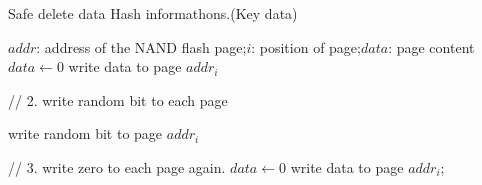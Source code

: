 \documentclass{ctexart}
\begin{document}
\begin{algorithm}[htb]
  \caption{Safe delete data Hash informathons.(Key data)}
  \begin{algorithmic}[1]
    \REQUIRE
    $addr$: address of the NAND flash page;$i$: position of page;$data$: page content
    \STATE $data \gets 0$
    \STATE write data to page $addr_i$
    \ENDFOR
    
    \STATE // 2. write random bit to each page

      \STATE write random bit to page $addr_i$
    \ENDFOR


    \STATE // 3. write zero to each page again.
    \STATE $data \gets 0$
    \STATE write data to page $addr_i$;
    \ENDFOR
  \end{algorithmic}
\end{algorithm}
\end{document}
